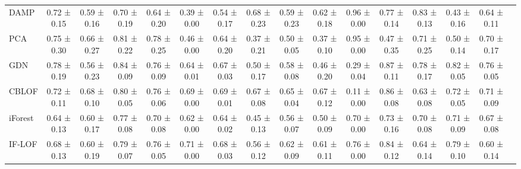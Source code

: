 \begin{tabular}{lccccccccccccccc}
DAMP & 0.72 ± 0.15 & 0.59 ± 0.16 & 0.70 ± 0.19 & 0.64 ± 0.20 & 0.39 ± 0.00 & 0.54 ± 0.17 & 0.68 ± 0.23 & 0.59 ± 0.23 & 0.62 ± 0.18 & 0.96 ± 0.00 & 0.77 ± 0.14 & 0.83 ± 0.13 & 0.43 ± 0.16 & 0.64 ± 0.11 \\
PCA & 0.75 ± 0.30 & 0.66 ± 0.27 & 0.81 ± 0.22 & 0.78 ± 0.25 & 0.46 ± 0.00 & 0.64 ± 0.20 & 0.37 ± 0.21 & 0.50 ± 0.05 & 0.37 ± 0.10 & 0.95 ± 0.00 & 0.47 ± 0.35 & 0.71 ± 0.25 & 0.50 ± 0.14 & 0.70 ± 0.17 \\
GDN & 0.78 ± 0.19 & 0.56 ± 0.23 & 0.84 ± 0.09 & 0.76 ± 0.09 & 0.64 ± 0.01 & 0.67 ± 0.03 & 0.50 ± 0.17 & 0.58 ± 0.08 & 0.46 ± 0.20 & 0.29 ± 0.04 & 0.87 ± 0.11 & 0.78 ± 0.17 & 0.82 ± 0.05 & 0.76 ± 0.05 \\
CBLOF & 0.72 ± 0.11 & 0.68 ± 0.10 & 0.80 ± 0.05 & 0.76 ± 0.06 & 0.69 ± 0.00 & 0.69 ± 0.01 & 0.67 ± 0.08 & 0.65 ± 0.04 & 0.67 ± 0.12 & 0.11 ± 0.00 & 0.86 ± 0.08 & 0.63 ± 0.08 & 0.72 ± 0.05 & 0.71 ± 0.09 \\
iForest & 0.64 ± 0.13 & 0.60 ± 0.17 & 0.77 ± 0.08 & 0.70 ± 0.08 & 0.62 ± 0.00 & 0.64 ± 0.02 & 0.45 ± 0.13 & 0.56 ± 0.07 & 0.50 ± 0.09 & 0.70 ± 0.00 & 0.73 ± 0.16 & 0.70 ± 0.08 & 0.71 ± 0.09 & 0.67 ± 0.08 \\
IF-LOF & 0.68 ± 0.13 & 0.60 ± 0.19 & 0.79 ± 0.07 & 0.76 ± 0.05 & 0.71 ± 0.00 & 0.68 ± 0.03 & 0.56 ± 0.12 & 0.62 ± 0.09 & 0.61 ± 0.11 & 0.76 ± 0.00 & 0.84 ± 0.12 & 0.64 ± 0.14 & 0.79 ± 0.10 & 0.60 ± 0.14 \\
\bottomrule
\end{tabular}
